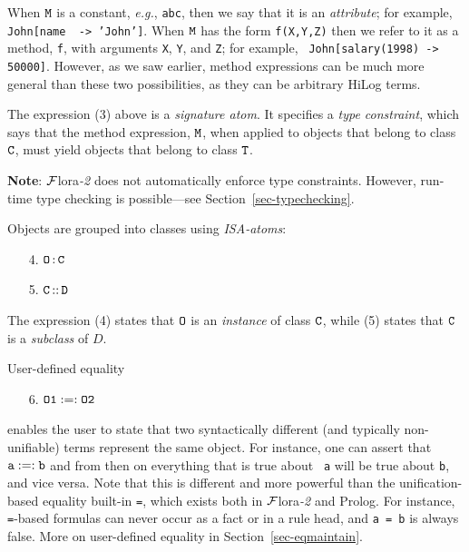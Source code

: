 \documentclass[11pt]{article}
\newcommand{\isa}{\,{\bf{:}}\,}
\newcommand{\subcl}{\,{\bf{::}}\,}
\newcommand{\mvd}{{\mbox{\tt \,->\,}}}  %
\newcommand{\FLORA}{{\mbox{\sc ${\cal F}${lora}\rm\emph{-2}}}\xspace}
\newcommand{\fl}{\mbox{F-logic}\xspace}
\begin{document}
\begin{itemize}
  When $\tt M$ is a constant, {\it e.g.}, {\tt abc}, then we say that it is
  an \emph{attribute}; for example, {\tt John[name \mvd 'John']}. When $\tt
  M$ has the form {\tt f(X,Y,Z)} then we refer to it as a method, {\tt f},
  with arguments {\tt X}, {\tt Y}, and {\tt Z}; for example, {\tt
  John[salary(1998)\mvd 50000]}.  However, as we saw
  earlier, method expressions can be much more general than these two
  possibilities, as they can be arbitrary HiLog terms.


  \medskip

  \index{signature!in \fl}
  The expression (3) above is a \emph{signature atom}. It specifies a
  \emph{type constraint}, which says
  that the method expression, $\tt M$, when applied to objects that belong
  to class $\tt C$, must yield objects that belong to class $\tt T$.

  {\bf Note}: \FLORA does not automatically enforce type constraints.
  However, run-time type checking is possible---see
  Section~\ref{sec-typechecking}.
  
  \medskip

  Objects are grouped into classes using \emph{ISA-atoms}:
  \medskip

  \begin{enumerate}
  \item[4.] $\tt O\isa C$
  \item[5.] \label{eq-subclass} $\tt C\subcl D$
  \end{enumerate}

  The expression (4) states that $\tt O$ is an \emph{instance} of class $\tt C$,
  while (5) states that $\tt C$ is a \emph{subclass} of $D$.

  User-defined equality
  \begin{enumerate}
    \item[6.] $\tt O1 :=: O2$
  \end{enumerate}
  enables the user to state that two syntactically different (and typically
  non-unifiable) terms represent the same object. For instance, one can
  assert that $\tt a :=: b$ and from then on everything that is true about {\tt
  a}  will be true about {\tt b}, and vice versa. Note that this is
  different and more powerful than the unification-based equality built-in
  {\tt =}, which exists both in \FLORA and Prolog. For instance, {\tt
  =}-based formulas can never occur as a fact or in a rule head, and {\tt a =
  b} is always false.  More on user-defined equality in
  Section~\ref{sec-eqmaintain}.


\end{itemize}
\end{document}
